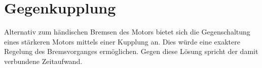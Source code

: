 \section{Gegenkupplung}
\label{gegenkupplung}

Alternativ zum händischen Bremsen des Motors bietet sich die Gegenschaltung eines stärkeren Motors mittels einer Kupplung an.
Dies würde eine exaktere Regelung des Bremsvorganges ermöglichen.
Gegen diese Lösung spricht der damit verbundene Zeitaufwand.
